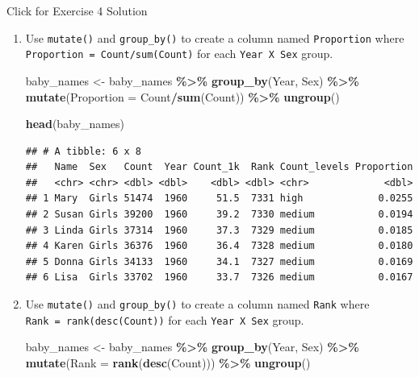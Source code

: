 \documentclass[
]{book}
\newenvironment{Shaded}{\begin{snugshade}}{\end{snugshade}}
\newcommand{\DataTypeTok}[1]{\textcolor[rgb]{0.13,0.29,0.53}{#1}}
\newcommand{\KeywordTok}[1]{\textcolor[rgb]{0.13,0.29,0.53}{\textbf{#1}}}
\newcommand{\NormalTok}[1]{#1}
\newcommand{\OperatorTok}[1]{\textcolor[rgb]{0.81,0.36,0.00}{\textbf{#1}}}
\newcommand{\StringTok}[1]{\textcolor[rgb]{0.31,0.60,0.02}{#1}}
\begin{document}
{Click for Exercise 4 Solution}

\begin{alert}

\begin{enumerate}
\def\labelenumi{\arabic{enumi}.}
\item
  Use \texttt{mutate()} and \texttt{group\_by()} to create a column named \texttt{Proportion} where \texttt{Proportion\ =\ Count/sum(Count)} for each \texttt{Year\ X\ Sex} group.

\begin{Shaded}
\begin{Highlighting}[]
\NormalTok{baby\_names \textless{}{-}}\StringTok{ }
\StringTok{  }\NormalTok{baby\_names }\OperatorTok{\%\textgreater{}\%}
\StringTok{  }\KeywordTok{group\_by}\NormalTok{(Year, Sex) }\OperatorTok{\%\textgreater{}\%}
\StringTok{  }\KeywordTok{mutate}\NormalTok{(}\DataTypeTok{Proportion =}\NormalTok{ Count}\OperatorTok{/}\KeywordTok{sum}\NormalTok{(Count)) }\OperatorTok{\%\textgreater{}\%}
\StringTok{  }\KeywordTok{ungroup}\NormalTok{()}

\KeywordTok{head}\NormalTok{(baby\_names) }
\end{Highlighting}
\end{Shaded}

\begin{verbatim}
## # A tibble: 6 x 8
##   Name  Sex   Count  Year Count_1k  Rank Count_levels Proportion
##   <chr> <chr> <dbl> <dbl>    <dbl> <dbl> <chr>             <dbl>
## 1 Mary  Girls 51474  1960     51.5  7331 high             0.0255
## 2 Susan Girls 39200  1960     39.2  7330 medium           0.0194
## 3 Linda Girls 37314  1960     37.3  7329 medium           0.0185
## 4 Karen Girls 36376  1960     36.4  7328 medium           0.0180
## 5 Donna Girls 34133  1960     34.1  7327 medium           0.0169
## 6 Lisa  Girls 33702  1960     33.7  7326 medium           0.0167
\end{verbatim}
\item
  Use \texttt{mutate()} and \texttt{group\_by()} to create a column named \texttt{Rank} where \texttt{Rank\ =\ rank(desc(Count))} for each \texttt{Year\ X\ Sex} group.

\begin{Shaded}
\begin{Highlighting}[]
\NormalTok{baby\_names \textless{}{-}}\StringTok{ }
\StringTok{  }\NormalTok{baby\_names }\OperatorTok{\%\textgreater{}\%}
\StringTok{  }\KeywordTok{group\_by}\NormalTok{(Year, Sex) }\OperatorTok{\%\textgreater{}\%}
\StringTok{  }\KeywordTok{mutate}\NormalTok{(}\DataTypeTok{Rank =} \KeywordTok{rank}\NormalTok{(}\KeywordTok{desc}\NormalTok{(Count))) }\OperatorTok{\%\textgreater{}\%}
\StringTok{  }\KeywordTok{ungroup}\NormalTok{()}


\end{Highlighting}
\end{Shaded}
\end{enumerate}
\end{alert}
\end{document}
